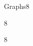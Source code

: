 \documentclass[a4paper]{article}
\begin{document}
\header


\begin{problem}{Graphs}{8}
\end{problem}

\begin{problem}{}{8}
\end{problem}

\begin{problem}{}{8}

\end{problem}
\end{document}
